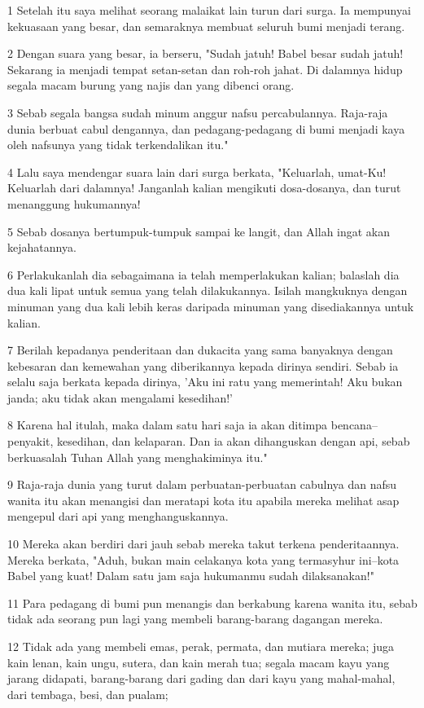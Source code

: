 \par 1 Setelah itu saya melihat seorang malaikat lain turun dari surga. Ia mempunyai kekuasaan yang besar, dan semaraknya membuat seluruh bumi menjadi terang.
\par 2 Dengan suara yang besar, ia berseru, "Sudah jatuh! Babel besar sudah jatuh! Sekarang ia menjadi tempat setan-setan dan roh-roh jahat. Di dalamnya hidup segala macam burung yang najis dan yang dibenci orang.
\par 3 Sebab segala bangsa sudah minum anggur nafsu percabulannya. Raja-raja dunia berbuat cabul dengannya, dan pedagang-pedagang di bumi menjadi kaya oleh nafsunya yang tidak terkendalikan itu."
\par 4 Lalu saya mendengar suara lain dari surga berkata, "Keluarlah, umat-Ku! Keluarlah dari dalamnya! Janganlah kalian mengikuti dosa-dosanya, dan turut menanggung hukumannya!
\par 5 Sebab dosanya bertumpuk-tumpuk sampai ke langit, dan Allah ingat akan kejahatannya.
\par 6 Perlakukanlah dia sebagaimana ia telah memperlakukan kalian; balaslah dia dua kali lipat untuk semua yang telah dilakukannya. Isilah mangkuknya dengan minuman yang dua kali lebih keras daripada minuman yang disediakannya untuk kalian.
\par 7 Berilah kepadanya penderitaan dan dukacita yang sama banyaknya dengan kebesaran dan kemewahan yang diberikannya kepada dirinya sendiri. Sebab ia selalu saja berkata kepada dirinya, 'Aku ini ratu yang memerintah! Aku bukan janda; aku tidak akan mengalami kesedihan!'
\par 8 Karena hal itulah, maka dalam satu hari saja ia akan ditimpa bencana--penyakit, kesedihan, dan kelaparan. Dan ia akan dihanguskan dengan api, sebab berkuasalah Tuhan Allah yang menghakiminya itu."
\par 9 Raja-raja dunia yang turut dalam perbuatan-perbuatan cabulnya dan nafsu wanita itu akan menangisi dan meratapi kota itu apabila mereka melihat asap mengepul dari api yang menghanguskannya.
\par 10 Mereka akan berdiri dari jauh sebab mereka takut terkena penderitaannya. Mereka berkata, "Aduh, bukan main celakanya kota yang termasyhur ini--kota Babel yang kuat! Dalam satu jam saja hukumanmu sudah dilaksanakan!"
\par 11 Para pedagang di bumi pun menangis dan berkabung karena wanita itu, sebab tidak ada seorang pun lagi yang membeli barang-barang dagangan mereka.
\par 12 Tidak ada yang membeli emas, perak, permata, dan mutiara mereka; juga kain lenan, kain ungu, sutera, dan kain merah tua; segala macam kayu yang jarang didapati, barang-barang dari gading dan dari kayu yang mahal-mahal, dari tembaga, besi, dan pualam;
